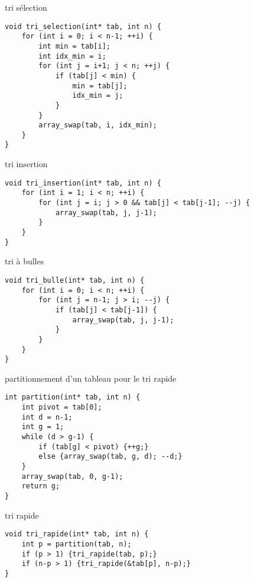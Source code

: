 \begin{imp*}{tri sélection}
\begin{verbatim}
void tri_selection(int* tab, int n) {
    for (int i = 0; i < n-1; ++i) {
        int min = tab[i];
        int idx_min = i;
        for (int j = i+1; j < n; ++j) {
            if (tab[j] < min) {
                min = tab[j];
                idx_min = j;
            }
        }
        array_swap(tab, i, idx_min);
    }
}
\end{verbatim}
\end{imp*}
\begin{imp*}{tri insertion}
\begin{verbatim}
void tri_insertion(int* tab, int n) {
    for (int i = 1; i < n; ++i) {
        for (int j = i; j > 0 && tab[j] < tab[j-1]; --j) {
            array_swap(tab, j, j-1);
        }
    }
}
\end{verbatim}
\end{imp*}
\begin{imp*}{tri à bulles}
\begin{verbatim}
void tri_bulle(int* tab, int n) {
    for (int i = 0; i < n; ++i) {
        for (int j = n-1; j > i; --j) {
            if (tab[j] < tab[j-1]) {
                array_swap(tab, j, j-1);
            }
        }
    }
}
\end{verbatim}
\end{imp*}
\begin{imp*}{partitionnement d'un tableau pour le tri rapide}
\begin{verbatim}
int partition(int* tab, int n) {
    int pivot = tab[0];
    int d = n-1;
    int g = 1;
    while (d > g-1) {
        if (tab[g] < pivot) {++g;}
        else {array_swap(tab, g, d); --d;}
    }
    array_swap(tab, 0, g-1);
    return g;
}
\end{verbatim}
\end{imp*}
\begin{imp*}{tri rapide}
\begin{verbatim}
void tri_rapide(int* tab, int n) {
    int p = partition(tab, n);
    if (p > 1) {tri_rapide(tab, p);}
    if (n-p > 1) {tri_rapide(&tab[p], n-p);}
}
\end{verbatim}
\end{imp*}
